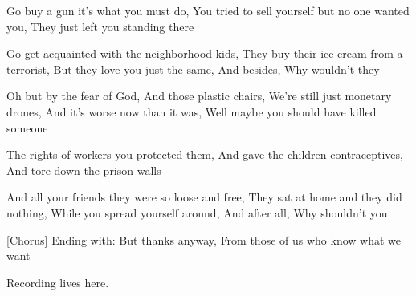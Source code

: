 Go buy a gun it's what you must do,
You tried to sell yourself but no one wanted you,
They just left you standing there

Go get acquainted with the neighborhood kids,
They buy their ice cream from a terrorist,
But they love you just the same,
And besides,
Why wouldn't they

Oh but by the fear of God,
And those plastic chairs,
We're still just monetary drones,
And it's worse now than it was,
Well maybe you should have killed someone

The rights of workers you protected them,
And gave the children contraceptives,
And tore down the prison walls

And all your friends they were so loose and free,
They sat at home and they did nothing,
While you spread yourself around,
And after all,
Why shouldn't you

[Chorus]
Ending with: But thanks anyway,
From those of us who know what we want

Recording lives here.
